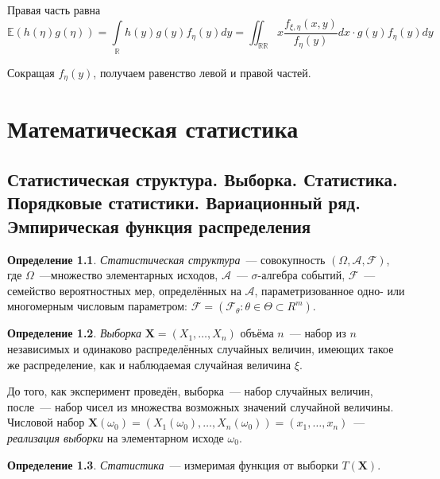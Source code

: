 \documentclass[oneside,final,14pt]{extreport}
\theoremstyle{plain}
\theoremstyle{definition}
\newtheorem*{defn}{Определение}
\theoremstyle{named}
\begin{document}
    Правая часть равна
    \begin{equation*}
        \mathbb{E}(h(\eta) g(\eta))=\int\limits_{\mathbb{R}} h(y) g(y) f_{\eta}(y) d y=\iint_{\mathbb{R} \mathbb{R}} x \frac{f_{\xi, \eta}(x, y)}{f_{\eta}(y)} d x \cdot g(y) f_{\eta}(y) d y
    \end{equation*}
    
    Сокращая $f_{\eta}(y)$, получаем равенство левой и правой частей.
    
\chapter{Математическая статистика}

\section{Статистическая структура. Выборка. Статистика. Порядковые статистики. Вариационный ряд. Эмпирическая функция распределения}

\begin{defn}
{\it Статистическая структура}~--- совокупность $(\Omega, \mathcal{A}, \mathcal{F})$, где $\Omega$~---множество элементарных исходов, $\mathcal{A}$~--- $\sigma$-алгебра событий, $\mathcal{F}$~--- семейство вероятностных мер, определённых на $\mathcal{A}$, параметризованное одно- или многомерным числовым параметром: $\mathcal{F} = (\mathcal{F}_{\theta}:\theta \in \Theta \subset R^{m})$.
\end{defn}

\begin{defn}
{\it Выборка} $\mathbf{X} = (X_{1}, \ldots, X_{n})$ объёма $n$~--- набор из $n$ независимых и одинаково распределённых случайных величин, имеющих такое же распределение, как и наблюдаемая случайная величина $\xi$.

\end{defn}

До того, как эксперимент проведён, выборка~--- набор случайных величин, после~--- набор чисел из множества возможных значений случайной величины. Числовой набор $\mathbf{X}(\omega_0) = (X_{1}(\omega_0), \ldots, X_{n}(\omega_0)) = (x_1, \ldots, x_n)$~--- {\it реализация выборки} на элементарном исходе $\omega_0$.

\begin{defn}
{\it Статистика}~--- измеримая функция от выборки $T(\mathbf{X})$.
\end{defn}
\end{document}
